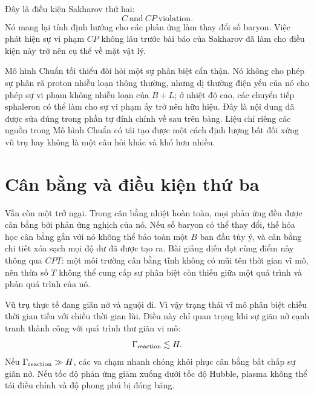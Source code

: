 Đây là điều kiện Sakharov thứ hai:
\begin{equation}
\boxed{C\ \text{and}\ CP\ \text{violation}.}
\end{equation}
Nó mang lại tính định hướng cho các phản ứng làm thay đổi số baryon. Việc phát hiện sự vi phạm \(CP\) không lâu trước bài báo của Sakharov đã làm cho điều kiện này trở nên cụ thể về mặt vật lý.

Mô hình Chuẩn tối thiểu đòi hỏi một sự phân biệt cẩn thận. Nó không cho phép sự phân rã proton nhiễu loạn thông thường, nhưng dị thường điện yếu của nó cho phép sự vi phạm không nhiễu loạn của \(B+L\); ở nhiệt độ cao, các chuyển tiếp sphaleron có thể làm cho sự vi phạm ấy trở nên hữu hiệu. Đây là nội dung đã được sửa đúng trong phần tự đính chính về sau trên bảng. Liệu chỉ riêng các nguồn trong Mô hình Chuẩn có tái tạo được một cách định lượng bất đối xứng vũ trụ hay không là một câu hỏi khác và khó hơn nhiều.

\section{Cân bằng và điều kiện thứ ba}

Vẫn còn một trở ngại. Trong cân bằng nhiệt hoàn toàn, mọi phản ứng đều được cân bằng bởi phản ứng nghịch của nó. Nếu số baryon có thể thay đổi, thế hóa học cân bằng gắn với nó không thể bảo toàn một \(B\) ban đầu tùy ý, và cân bằng chi tiết xóa sạch mọi độ dư đã được tạo ra. Bài giảng diễn đạt cùng điểm này thông qua \(CPT\): một môi trường cân bằng tĩnh không có mũi tên thời gian vĩ mô, nên thừa số \(T\) không thể cung cấp sự phân biệt còn thiếu giữa một quá trình và phản quá trình của nó.

Vũ trụ thực tế đang giãn nở và nguội đi. Vì vậy trạng thái vĩ mô phân biệt chiều thời gian tiến với chiều thời gian lùi. Điều này chỉ quan trọng khi sự giãn nở cạnh tranh thành công với quá trình thư giãn vi mô:
\begin{equation}
\Gamma_{\rm reaction}\lesssim H.
\label{eq:c08-freezeout-condition}
\end{equation}
Nếu \(\Gamma_{\rm reaction}\gg H\), các va chạm nhanh chóng khôi phục cân bằng bất chấp sự giãn nở. Nếu tốc độ phản ứng giảm xuống dưới tốc độ Hubble, plasma không thể tái điều chỉnh và độ phong phú bị đóng băng.

\begin{classroomqa}
\end{classroomqa}

